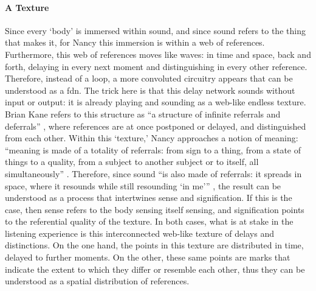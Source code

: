 \paragraph{A Texture}
Since every `body' is immersed within sound, and since sound refers to the thing that makes it, for Nancy this immersion is within a web of references. Furthermore, this web of references moves like waves: in time and space, back and forth, delaying in every next moment and distinguishing in every other reference. Therefore, instead of a loop, a more convoluted circuitry appears that can be understood as a \gls{fdn}. The trick here is that this delay network sounds without input or output: it is already playing and sounding as a web-like endless texture. Brian Kane refers to this structure as ``a structure of infinite referrals and deferrals'' \parencite[143]{Gra15:The}, where references are at once postponed or delayed, and distinguished from each other. Within this `texture,' Nancy approaches a notion of meaning: ``meaning is made of a totality of referrals: from sign to a thing, from a state of things to a quality, from a subject to another subject or to itself, all simultaneously'' \parencite[4-9]{Nan07:Lis}. Therefore, since sound  ``is also made of referrals: it spreads in space, where it resounds while still resounding `in me''' \parencite[4-9]{Nan07:Lis}, the result can be understood as a process that intertwines sense and signification. If this is the case, then sense refers to the body sensing itself sensing, and signification points to the referential quality of the texture. In both cases, what is at stake in the listening experience is this interconnected web-like texture of delays and distinctions. On the one hand, the points in this texture are distributed in time, delayed to further moments. On the other, these same points are marks that indicate the extent to which they differ or resemble each other, thus they can be understood as a spatial distribution of references. 

